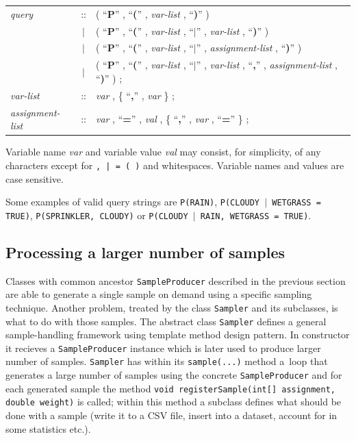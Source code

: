 \documentclass[english,cover]{fitthesis} %
\newcommand{\srccode}[1]{{\tt #1}}         %
\newcommand{\bnfconst}[1]{``\textbf{#1}''} %
\newcommand{\bnfgroup}[1]{\textit{#1}}     %
\begin{document}
\begin{center}
\begin{tabular}{lcl}
    \bnfgroup{query} & ::
        & ( \bnfconst{P} , \bnfconst{(} , \bnfgroup{var-list} , \bnfconst{)} ) \\
    & $\mid$
        & ( \bnfconst{P} , \bnfconst{(} , \bnfgroup{var-list} , \bnfconst{$\mid$} , \bnfgroup{var-list} , \bnfconst{)} ) \\
    & $\mid$
        & ( \bnfconst{P} , \bnfconst{(} , \bnfgroup{var-list} , \bnfconst{$\mid$} , \bnfgroup{assignment-list} , \bnfconst{)} ) \\
    & $\mid$
        & ( \bnfconst{P} , \bnfconst{(} , \bnfgroup{var-list} , \bnfconst{$\mid$} , \bnfgroup{var-list} , \bnfconst{,} , \bnfgroup{assignment-list} , \bnfconst{)} ) ; \\
    \bnfgroup{var-list} & ::
        & \bnfgroup{var} , \{ \bnfconst{,} , \bnfgroup{var} \} ; \\
    \bnfgroup{assignment-list} & ::
        & \bnfgroup{var} , \bnfconst{=} , \bnfgroup{val} , \{ \bnfconst{,} , \bnfgroup{var} , \bnfconst{=} \} ; \\
\end{tabular}
\end{center}

Variable name \bnfgroup{var} and variable value \bnfgroup{val} may consist, for simplicity, of any characters except for {\tt , | = ( )} and whitespaces. Variable names and values are case sensitive.

Some examples of valid query strings are \srccode{P(RAIN)}, \srccode{P(CLOUDY $\mid$ WETGRASS = TRUE)}, \srccode{P(SPRINKLER, CLOUDY)} or \srccode{P(CLOUDY $\mid$ RAIN, WETGRASS = TRUE)}.



\subsection{Processing a larger number of samples}
Classes with common ancestor \srccode{SampleProducer} described in the previous section are able to generate a single sample on demand using a specific sampling technique. Another problem, treated by the class \srccode{Sampler} and its subclasses, is what to do with those samples. The abstract class \srccode{Sampler} defines a general sample-handling framework using template method design pattern. In constructor it recieves a \srccode{SampleProducer} instance which is later used to produce larger number of samples. \srccode{Sampler} has within its \srccode{sample(...)} method a~loop that generates a large number of samples using the concrete \srccode{SampleProducer} and for each generated sample the method \srccode{void registerSample(int[] assignment, double weight)} is called; within this method a subclass defines what should be done with a sample (write it to a CSV file, insert into a dataset, account for in some statistics etc.).
\end{document}
